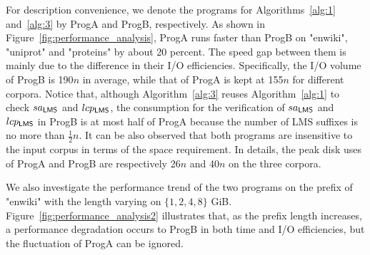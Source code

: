 \documentclass[10pt,journal,compsoc]{IEEEtran}
\begin{document}
	For description convenience, we denote the programs for Algorithms~\ref{alg:1} and~\ref{alg:3} by ProgA and ProgB, respectively. As shown in Figure~\ref{fig:performance_analysis}, ProgA runs faster than ProgB on "enwiki", "uniprot" and "proteins" by about 20 percent. The speed gap between them is mainly due to the difference in their I/O efficiencies. Specifically, the I/O volume of ProgB is 190$n$ in average, while that of ProgA is kept at 155$n$ for different corpora. Notice that, although Algorithm~\ref{alg:3} reuses Algorithm~\ref{alg:1} to check $sa_{\sf LMS}$ and $lcp_{\sf LMS}$, the consumption for the verification of $sa_{\sf LMS}$ and $lcp_{\sf LMS}$ in ProgB is at most half of ProgA because the number of LMS suffixes is no more than $\frac{1}{2}n$. It can be also observed that both programs are insensitive to the input corpus in terms of the space requirement. In details, the peak disk uses of ProgA and ProgB are respectively 26$n$ and 40$n$ on the three corpora.
	
	We also investigate the performance trend of the two programs on the prefix of "enwiki" with the length varying on $\{1, 2, 4, 8\}$ GiB. Figure~\ref{fig:performance_analysis2} illustrates that, as the prefix length increases, a performance degradation occurs to ProgB in both time and I/O efficiencies, but the fluctuation of ProgA can be ignored.
	
\end{document}
